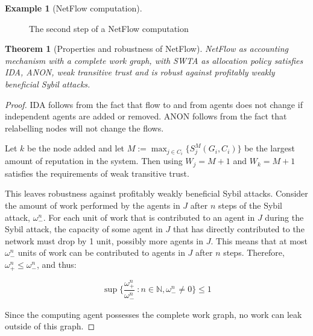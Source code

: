 \documentclass[a4paper,11pt]{book}
\newcommand{\bb}{\mathbb}
\newtheorem{theorem}{Theorem}
\theoremstyle{definition}
\newtheorem{example}{Example}
\begin{document}
\begin{example}[NetFlow computation]
\begin{figure}[h]
     \caption{The second step of a NetFlow computation}
     \label{fig:ex_nf_2}
\end{figure}

\end{example}
\FloatBarrier
\begin{theorem}[Properties and robustness of NetFlow]
    NetFlow as accounting mechanism with a complete work graph, with SWTA as allocation policy
    satisfies IDA, ANON, weak transitive trust and is robust against
    profitably weakly beneficial Sybil attacks.

    \label{thm:prop-rob-NetFlow}
\end{theorem}




\begin{proof}
    IDA follows from the fact that flow to and from agents does not change if independent agents
    are added or removed. ANON follows from the fact that relabelling nodes will not change the flows.

    Let $k$ be the node added and let 
    $M := \max_{j \in C_i}\{S^M_j(G_i, C_i)\}$ be the largest amount of reputation in the system.
    Then using $W_j = M+1$ and $W_k = M+1$ satisfies the requirements of weak transitive trust.

    This leaves robustness against profitably weakly beneficial Sybil attacks. Consider the amount of
    work performed by the agents in $J$ after $n$ steps of the Sybil attack,  $\omega^n_-$. For each
    unit of work that is contributed to an agent in $J$ during the Sybil attack, the capacity
    of some agent in $J$ that has directly contributed to the network must drop by 1 unit, possibly more
    agents in $J$. This means that at most $\omega^n_-$ units of work can be contributed to agents
    in $J$ after $n$ steps. Therefore, $\omega^n_+ \leq \omega^n_-$, and thus:

    \begin{equation*}
        \sup \{\frac{\omega^n_+}{\omega^n_-}\ : n \in \bb{N}, \omega^n_- \neq 0\} \leq 1
    \end{equation*}

    Since the computing agent possesses the complete work graph, no work can leak outside of this graph.
\end{proof}
\end{document}
